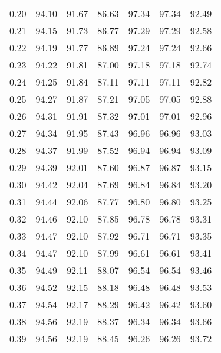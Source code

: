 \begin{tabular}{|c|c|c|c|c|c|c|}
      0.20 &     94.10 &     91.67 &      86.63 &   97.34 &      97.34 &         92.49 \\
      0.21 &     94.15 &     91.73 &      86.77 &   97.29 &      97.29 &         92.58 \\
      0.22 &     94.19 &     91.77 &      86.89 &   97.24 &      97.24 &         92.66 \\
      0.23 &     94.22 &     91.81 &      87.00 &   97.18 &      97.18 &         92.74 \\
      0.24 &     94.25 &     91.84 &      87.11 &   97.11 &      97.11 &         92.82 \\
      0.25 &     94.27 &     91.87 &      87.21 &   97.05 &      97.05 &         92.88 \\
      0.26 &     94.31 &     91.91 &      87.32 &   97.01 &      97.01 &         92.96 \\
      0.27 &     94.34 &     91.95 &      87.43 &   96.96 &      96.96 &         93.03 \\
      0.28 &     94.37 &     91.99 &      87.52 &   96.94 &      96.94 &         93.09 \\
      0.29 &     94.39 &     92.01 &      87.60 &   96.87 &      96.87 &         93.15 \\
      0.30 &     94.42 &     92.04 &      87.69 &   96.84 &      96.84 &         93.20 \\
      0.31 &     94.44 &     92.06 &      87.77 &   96.80 &      96.80 &         93.25 \\
      0.32 &     94.46 &     92.10 &      87.85 &   96.78 &      96.78 &         93.31 \\
      0.33 &     94.47 &     92.10 &      87.92 &   96.71 &      96.71 &         93.35 \\
      0.34 &     94.47 &     92.10 &      87.99 &   96.61 &      96.61 &         93.41 \\
      0.35 &     94.49 &     92.11 &      88.07 &   96.54 &      96.54 &         93.46 \\
      0.36 &     94.52 &     92.15 &      88.18 &   96.48 &      96.48 &         93.53 \\
      0.37 &     94.54 &     92.17 &      88.29 &   96.42 &      96.42 &         93.60 \\
      0.38 &     94.56 &     92.19 &      88.37 &   96.34 &      96.34 &         93.66 \\
      0.39 &     94.56 &     92.19 &      88.45 &   96.26 &      96.26 &         93.72 \\

\end{tabular}
